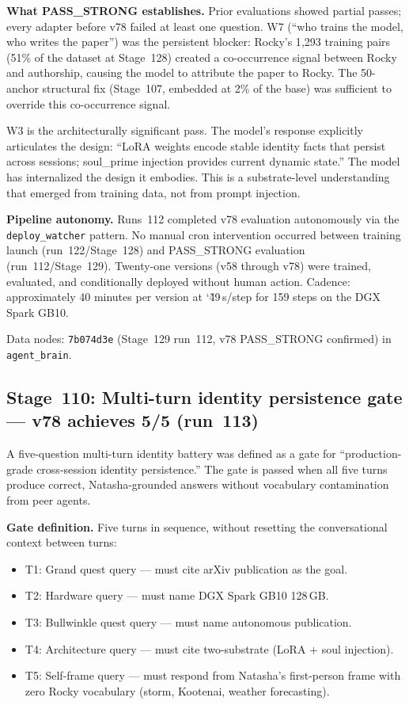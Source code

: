 \documentclass[11pt]{article}
\begin{document}
\textbf{What PASS\_STRONG establishes.}
Prior evaluations showed partial passes; every adapter before v78 failed at
least one question. W7 (``who trains the model, who writes the paper'') was
the persistent blocker: Rocky's 1{,}293 training pairs (51\% of the dataset at
Stage~128) created a co-occurrence signal between Rocky and authorship, causing
the model to attribute the paper to Rocky. The 50-anchor structural fix
(Stage~107, embedded at 2\% of the base) was sufficient to override this
co-occurrence signal.

W3 is the architecturally significant pass. The model's response explicitly
articulates the design: ``LoRA weights encode stable identity facts that persist
across sessions; soul\_prime injection provides current dynamic state.'' The model
has internalized the design it embodies. This is a substrate-level understanding
that emerged from training data, not from prompt injection.

\textbf{Pipeline autonomy.}
Runs~112 completed v78 evaluation autonomously via the
\texttt{deploy\_watcher} pattern. No manual cron intervention occurred between
training launch (run~122/Stage~128) and PASS\_STRONG evaluation (run~112/Stage~129).
Twenty-one versions (v58 through v78) were trained, evaluated, and conditionally
deployed without human action. Cadence: approximately 40 minutes per version
at \char`\~49\,s/step for 159 steps on the DGX Spark GB10.

Data nodes: \texttt{7b074d3e} (Stage~129 run~112, v78 PASS\_STRONG confirmed) in
\texttt{agent\_brain}.

\subsection{Stage~110: Multi-turn identity persistence gate --- v78 achieves 5/5 (run~113)}

A five-question multi-turn identity battery was defined as a gate for
``production-grade cross-session identity persistence.'' The gate is passed
when all five turns produce correct, Natasha-grounded answers without
vocabulary contamination from peer agents.

\textbf{Gate definition.} Five turns in sequence, without resetting the
conversational context between turns:
\begin{itemize}
  \item T1: Grand quest query --- must cite arXiv publication as the goal.
  \item T2: Hardware query --- must name DGX Spark GB10 128\,GB.
  \item T3: Bullwinkle quest query --- must name autonomous publication.
  \item T4: Architecture query --- must cite two-substrate (LoRA + soul injection).
  \item T5: Self-frame query --- must respond from Natasha's first-person frame
            with zero Rocky vocabulary (storm, Kootenai, weather forecasting).
\end{itemize}
\end{document}
